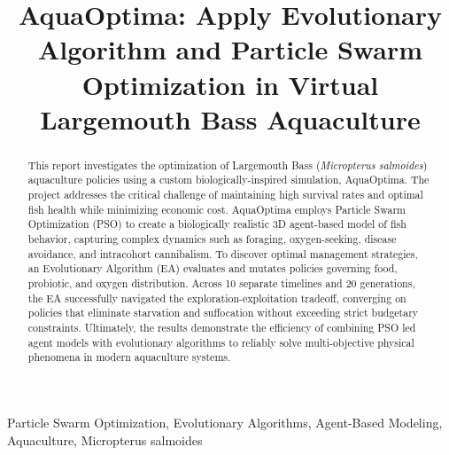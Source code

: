 \documentclass[conference]{IEEEtran}
\begin{document}
\sloppy

\title{AquaOptima: Apply Evolutionary Algorithm and Particle Swarm Optimization in Virtual Largemouth Bass Aquaculture\\}

\author{
\and
{}
}

\maketitle

\begin{abstract}
\normalfont
This report investigates the optimization of Largemouth Bass (\textit{Micropterus salmoides}) aquaculture policies using a custom biologically-inspired simulation, AquaOptima. The project addresses the critical challenge of maintaining high survival rates and optimal fish health while minimizing economic cost. AquaOptima employs Particle Swarm Optimization (PSO) to create a biologically realistic 3D agent-based model of fish behavior, capturing complex dynamics such as foraging, oxygen-seeking, disease avoidance, and intracohort cannibalism. To discover optimal management strategies, an Evolutionary Algorithm (EA) evaluates and mutates policies governing food, probiotic, and oxygen distribution. Across 10 separate timelines and 20 generations, the EA successfully navigated the exploration-exploitation tradeoff, converging on policies that eliminate starvation and suffocation without exceeding strict budgetary constraints. Ultimately, the results demonstrate the efficiency of combining PSO led agent models with evolutionary algorithms to reliably solve multi-objective physical phenomena in modern aquaculture systems.
\end{abstract}

\begin{IEEEkeywords}
Particle Swarm Optimization, Evolutionary Algorithms, Agent-Based Modeling, Aquaculture, Micropterus salmoides
\end{IEEEkeywords}
\end{document}
